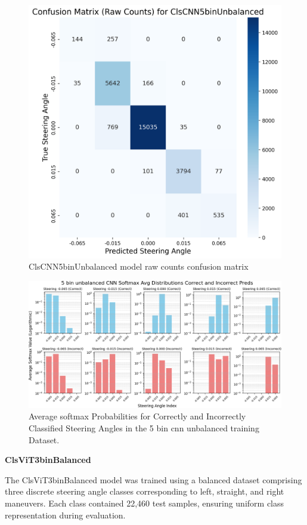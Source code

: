 \begin{figure}[H]
\centering
\includegraphics[width=0.65\linewidth]{Figures/Results/cm_raw_ClsCNN5binUnbalanced.png}
\caption{ClsCNN5binUnbalanced model raw counts confusion matrix}
\label{fig:cm_raw_ClsCNN5binUnbalanced}
\end{figure}

\begin{figure}[H]
    \centering
    \includegraphics[width=1\linewidth]{Figures/Results/5_bins_cnn_softmax_dist_plot_unbalanced.png}
    \caption{Average softmax Probabilities for Correctly and Incorrectly Classified Steering Angles in the 5 bin cnn unbalanced training Dataset.}
    \label{fig:5_bins_cnn_softmax_dist_unbalanced}
\end{figure}


\textbf{ClsViT3binBalanced}

The ClsViT3binBalanced model was trained using a balanced dataset comprising three discrete steering angle classes corresponding to left, straight, and right maneuvers. Each class contained 22,460 test samples, ensuring uniform class representation during evaluation.


